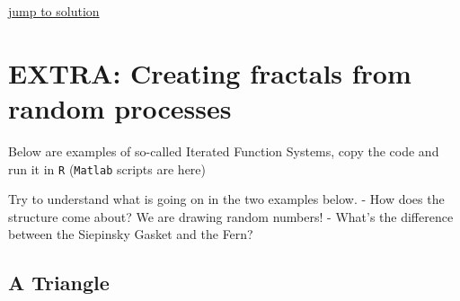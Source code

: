 \documentclass[]{book}
\let\stdsection\section
\renewcommand\section{\newpage\stdsection}
\begin{document}
\protect\hyperlink{hrvsol}{\textbar{} jump to solution \textbar{}}

\section{EXTRA: Creating fractals from random
processes}\label{extra-creating-fractals-from-random-processes}

Below are examples of so-called Iterated Function Systems, copy the code
and run it in \texttt{R} (\texttt{Matlab} scripts are here)

Try to understand what is going on in the two examples below. - How does
the structure come about? We are drawing random numbers! - What's the
difference between the Siepinsky Gasket and the Fern?

\subsection{A Triangle}\label{a-triangle}
\end{document}
